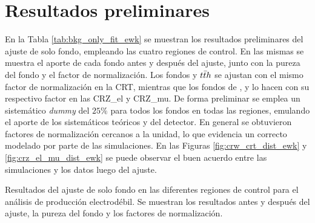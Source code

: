 \section{Resultados preliminares}


En la Tabla \ref{tab:bkg_only_fit_ewk} se muestran los resultados preliminares del ajuste de solo fondo, empleando las cuatro regiones de control. En las mismas se muestra el aporte de cada fondo antes y después del ajuste, junto con la pureza del fondo y el factor de normalización. Los fondos \ttbarph y $t\bar{t} h$ se ajustan con el mismo factor de normalización en la CRT, mientras que los fondos de \znunuph, \zeeph y \zmumuph lo hacen con su respectivo factor en las CRZ\_el y CRZ\_mu. De forma preliminar se emplea un sistemático \textit{dummy} del $25\%$ para todos los fondos en todas las regiones, emulando el aporte de los sistemáticos teóricos y del detector. En general se obtuvieron factores de normalización cercanos a la unidad, lo que evidencia un correcto modelado por parte de las simulaciones. En las Figuras \ref{fig:crw_crt_dist_ewk} y \ref{fig:crz_el_mu_dist_ewk} se puede observar el buen acuerdo entre las simulaciones y los datos luego del ajuste.

\begin{table}[ht!]
  \centering
  \caption{Resultados del ajuste de solo fondo en las diferentes regiones de control para el análisis de producción electrodébil. Se muestran los resultados antes y después del ajuste, la pureza del fondo y los factores de normalización.}
  
  \label{tab:bkgonly_cr}
\end{table}


